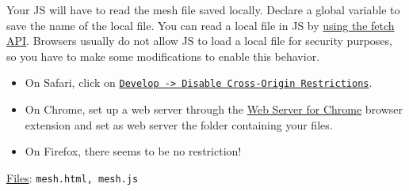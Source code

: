 \documentclass[addpoints]{exam}
\begin{document}
\begin{questions}
  
  Your JS will have to read the mesh file saved locally. Declare a global variable to save the name of the local file. You can read a local file in JS by \href{https://stackoverflow.com/a/46129280/1382487}{using the fetch API}. Browsers usually do not allow JS to load a local file for security purposes, so you have to make some modifications to enable this behavior.
  \begin{itemize}
  \item On Safari, click on \href{https://stackoverflow.com/questions/4556429/disabling-same-origin-policy-in-safari}{\tt Develop -> Disable Cross-Origin Restrictions}.
  \item On Chrome, set up a web server through the \href{https://chrome.google.com/webstore/detail/web-server-for-chrome/ofhbbkphhbklhfoeikjpcbhemlocgigb}{Web Server for Chrome} browser extension and set as web server the folder containing your files.
  \item On Firefox, there seems to be no restriction!
  \end{itemize}
  \noindent\underline{Files}: {\tt mesh.html, mesh.js}

\end{questions}
\end{document}
